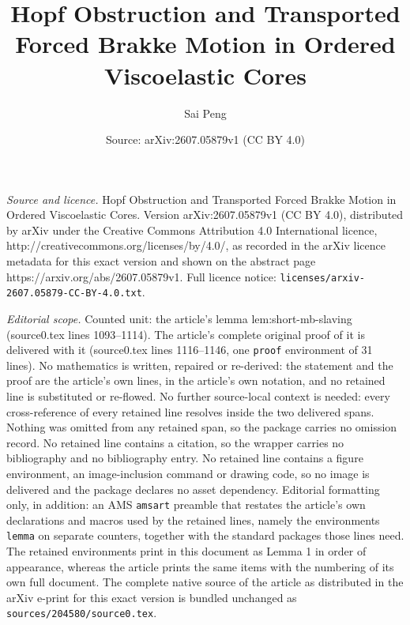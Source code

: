 \documentclass[10pt,a4paper]{amsart}
\title{Hopf Obstruction and Transported Forced Brakke Motion in Ordered Viscoelastic Cores}
\author{Sai Peng}
\date{Source: arXiv:2607.05879v1 (CC BY 4.0)}
\begin{document}
\maketitle

\noindent\emph{Source and licence.} Hopf Obstruction and Transported Forced Brakke Motion in Ordered Viscoelastic Cores. Version arXiv:2607.05879v1 (CC BY 4.0), distributed by arXiv under the Creative Commons Attribution 4.0 International licence, http://creativecommons.org/licenses/by/4.0/, as recorded in the arXiv licence metadata for this exact version and shown on the abstract page https://arxiv.org/abs/2607.05879v1. Full licence notice: \texttt{licenses/arxiv-2607.05879-CC-BY-4.0.txt}.\par\smallskip

\noindent\textit{Editorial scope.} Counted unit: the article's lemma lem:short-mb-slaving (source0.tex lines 1093--1114). The article's complete original proof of it is delivered with it (source0.tex lines 1116--1146, one \texttt{proof} environment of 31 lines). No mathematics is written, repaired or re-derived: the statement and the proof are the article's own lines, in the article's own notation, and no retained line is substituted or re-flowed.  No further source-local context is needed: every cross-reference of every retained line resolves inside the two delivered spans.  Nothing was omitted from any retained span, so the package carries no omission record.  No retained line contains a citation, so the wrapper carries no bibliography and no bibliography entry.  No retained line contains a figure environment, an image-inclusion command or drawing code, so no image is delivered and the package declares no asset dependency.  Editorial formatting only, in addition: an AMS \texttt{amsart} preamble that restates the article's own declarations and macros used by the retained lines, namely the environments \texttt{lemma} on separate counters, together with the standard packages those lines need.  The retained environments print in this document as Lemma 1 in order of appearance, whereas the article prints the same items with the numbering of its own full document.  The complete native source of the article as distributed in the arXiv e-print for this exact version is bundled unchanged as \texttt{sources/204580/source0.tex}.
\end{document}
